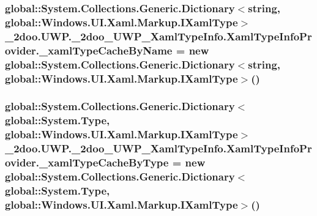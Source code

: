 \hypertarget{class__2doo_1_1_u_w_p_1_1__2doo___u_w_p___xaml_type_info_1_1_xaml_type_info_provider_5d88548b5b6d2a0898199478cd6b61a8}{
\subsubsection[{\_\-xamlTypeCacheByName}]{\setlength{\rightskip}{0pt plus 5cm}global::System.Collections.Generic.Dictionary$<$string, global::Windows.UI.Xaml.Markup.IXamlType$>$ {\bf \_\-2doo.UWP.\_\-2doo\_\-UWP\_\-XamlTypeInfo.XamlTypeInfoProvider.\_\-xamlTypeCacheByName} = new global::System.Collections.Generic.Dictionary$<$string, global::Windows.UI.Xaml.Markup.IXamlType$>$()}}
\label{class__2doo_1_1_u_w_p_1_1__2doo___u_w_p___xaml_type_info_1_1_xaml_type_info_provider_5d88548b5b6d2a0898199478cd6b61a8}


\hypertarget{class__2doo_1_1_u_w_p_1_1__2doo___u_w_p___xaml_type_info_1_1_xaml_type_info_provider_eba82514ea081ddecb11710f06466977}{
\subsubsection[{\_\-xamlTypeCacheByType}]{\setlength{\rightskip}{0pt plus 5cm}global::System.Collections.Generic.Dictionary$<$global::System.Type, global::Windows.UI.Xaml.Markup.IXamlType$>$ {\bf \_\-2doo.UWP.\_\-2doo\_\-UWP\_\-XamlTypeInfo.XamlTypeInfoProvider.\_\-xamlTypeCacheByType} = new global::System.Collections.Generic.Dictionary$<$global::System.Type, global::Windows.UI.Xaml.Markup.IXamlType$>$()}}
\label{class__2doo_1_1_u_w_p_1_1__2doo___u_w_p___xaml_type_info_1_1_xaml_type_info_provider_eba82514ea081ddecb11710f06466977}




